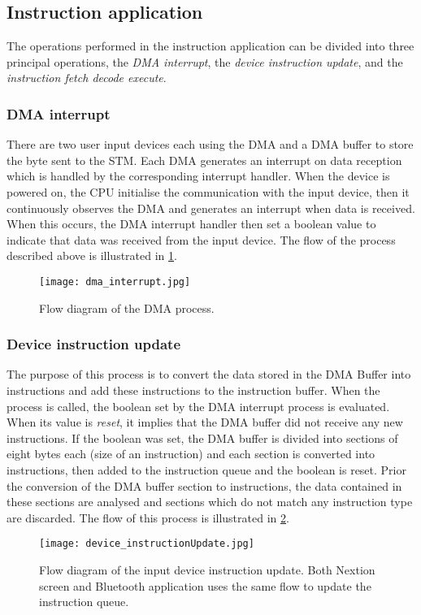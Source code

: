 \subsection{Instruction application}
The operations performed in the instruction application can be divided into three principal operations, the \textit{DMA interrupt}, the \textit{device instruction update}, and the \textit{instruction fetch decode execute}.
\subsubsection{DMA interrupt}
There are two user input devices each using the DMA and a DMA buffer to store the byte sent to the STM. Each DMA generates an interrupt on data reception which is handled by the corresponding interrupt handler. When the device is powered on, the CPU initialise the communication with the input device, then it continuously observes the DMA and generates an interrupt when data is received. When this occurs, the DMA interrupt handler then set a boolean value to indicate that data was received from the input device. The flow of the process described above is illustrated in \cref{fig:dma_interrupt}. 
\begin{figure}[ht]
\centering
\texttt{[image: dma\_interrupt.jpg]}
\caption{Flow diagram of the DMA process.}
\label{fig:dma_interrupt}
\end{figure}

\subsubsection{Device instruction update}
The purpose of this process is to convert the data stored in the DMA Buffer into instructions and add these instructions to the instruction buffer. When the process is called, the boolean set by the DMA interrupt process is evaluated. When its value is \textit{reset}, it implies that the DMA buffer did not receive any new instructions. If the boolean was set, the DMA buffer is divided into sections of eight bytes each (size of an instruction) and each section is converted into instructions, then added to the instruction queue and the boolean is reset. Prior the conversion of the DMA buffer section to instructions, the data contained in these sections are analysed and sections which do not match any instruction type are discarded. The flow of this process is illustrated in \cref{fig:device_instructionUpdate}. 
\begin{figure}[ht]
\centering
\texttt{[image: device\_instructionUpdate.jpg]}
\caption{Flow diagram of the input device instruction update. Both Nextion screen and Bluetooth application uses the same flow to update the instruction queue.}
\label{fig:device_instructionUpdate}
\end{figure}

